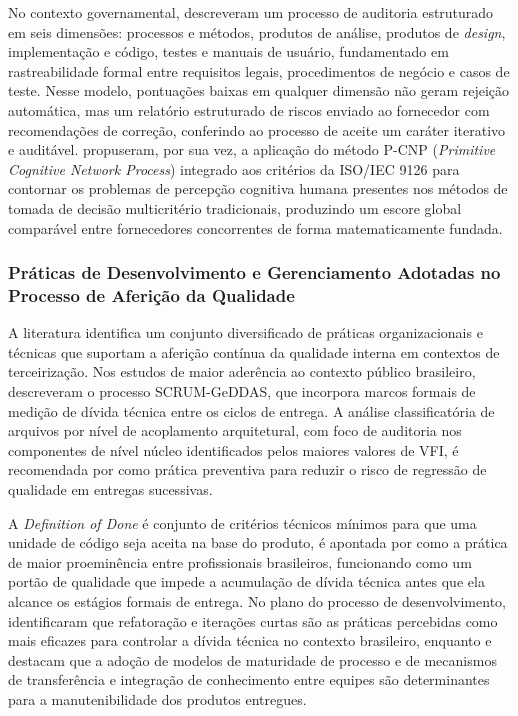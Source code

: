 No contexto governamental,  descreveram um processo de auditoria estruturado em seis dimensões: processos e métodos, produtos de análise, produtos de \textit{design}, implementação e código, testes e manuais de usuário, fundamentado em rastreabilidade formal entre requisitos legais, procedimentos de negócio e casos de teste. Nesse modelo, pontuações baixas em qualquer dimensão não geram rejeição automática, mas um relatório estruturado de riscos enviado ao fornecedor com recomendações de correção, conferindo ao processo de aceite um caráter iterativo e auditável.  propuseram, por sua vez, a aplicação do método P-CNP (\textit{Primitive Cognitive Network Process}) integrado aos critérios da ISO/IEC 9126 para contornar os problemas de percepção cognitiva humana presentes nos métodos de tomada de decisão multicritério tradicionais, produzindo um escore global comparável entre fornecedores concorrentes de forma matematicamente fundada.

\subsubsection{Práticas de Desenvolvimento e Gerenciamento Adotadas no Processo de Aferição da Qualidade}

A literatura identifica um conjunto diversificado de práticas organizacionais e técnicas que suportam a aferição contínua da qualidade interna em contextos de terceirização. Nos estudos de maior aderência ao contexto público brasileiro,  descreveram o processo SCRUM-GeDDAS, que incorpora marcos formais de medição de dívida técnica entre os ciclos de entrega. A análise classificatória de arquivos por nível de acoplamento arquitetural, com foco de auditoria nos componentes de nível núcleo identificados pelos maiores valores de VFI, é recomendada por  como prática preventiva para reduzir o risco de regressão de qualidade em entregas sucessivas.

A \textit{Definition of Done} é conjunto de critérios técnicos mínimos para que uma unidade de código seja aceita na base do produto, é apontada por  como a prática de maior proeminência entre profissionais brasileiros, funcionando como um portão de qualidade que impede a acumulação de dívida técnica antes que ela alcance os estágios formais de entrega. No plano do processo de desenvolvimento,  identificaram que refatoração e iterações curtas são as práticas percebidas como mais eficazes para controlar a dívida técnica no contexto brasileiro, enquanto  e  destacam que a adoção de modelos de maturidade de processo e de mecanismos de transferência e integração de conhecimento entre equipes são determinantes para a manutenibilidade dos produtos entregues.

